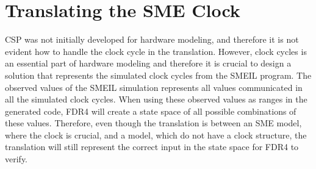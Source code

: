 \section{Translating the SME Clock}
CSP was not initially developed for hardware modeling, and therefore it is not evident how to handle the clock cycle in the translation. However, clock cycles is an essential part of hardware modeling and therefore it is crucial to design a solution that represents the simulated clock cycles from the SMEIL program. The observed values of the SMEIL simulation represents all values communicated in all the simulated clock cycles.
When using these observed values as ranges in the generated \cspm{} code, FDR4 will create a state space of all possible combinations of these values.
Therefore, even though the translation is between an SME model, where the clock is crucial, and a \cspm{} model, which do not have a clock structure, the translation will still represent the correct input in the state space for FDR4 to verify.




%
%
%
%
